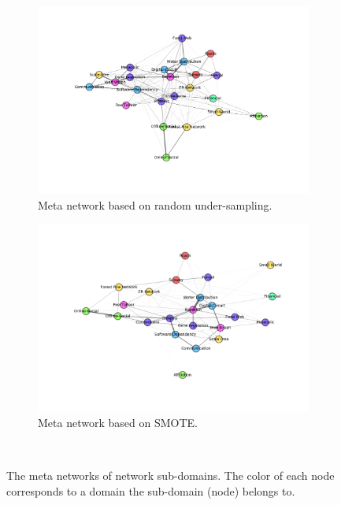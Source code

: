 \documentclass{article}
\begin{document}
\begin{figure}[H]
	\medskip
	\begin{subfigure}{0.48\textwidth}
	\includegraphics[width=\linewidth]{figs/similarity/SubDomain/RandomUnder_all5/graph.png}
	\caption{Meta network based on random under-sampling.} \label{random_under_graph_sub_original}
	\end{subfigure}\hspace*{\fill}
	\begin{subfigure}{0.48\textwidth}
	\includegraphics[width=\linewidth]{figs/similarity/SubDomain/SMOTE/graph.png}
	\caption{Meta network based on SMOTE.} \label{smote_graph_sub_original}
	\end{subfigure}
\
\caption{The meta networks of network sub-domains. The color of each node corresponds to a domain the sub-domain (node) belongs to.} \label{meta_network}
\end{figure}
\end{document}
